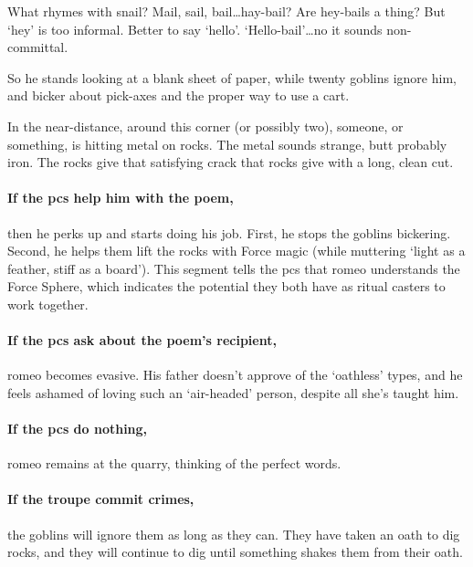 \begin{multicols}{2}
\begin{speechtext}
  What rhymes with snail?
  Mail, sail, bail\ldots hay-bail?
  Are hey-bails a thing?
  But `hey' is too informal.
  Better to say `hello'.
  `Hello-bail'\ldots no it sounds non-committal.
\end{speechtext}

So he stands looking at a blank sheet of paper, while twenty goblins ignore him, and bicker about pick-axes and the proper way to use a cart.

\begin{boxtext}
  In the near-distance, around this corner (or possibly two), someone, or something, is hitting metal on rocks.
  The metal sounds strange, butt probably iron.
  The rocks give that satisfying crack that rocks give with a long, clean cut.
\end{boxtext}

\paragraph{If the \glspl{pc} help him with the poem,}
then he perks up and starts doing his job.
First, he stops the goblins bickering.
Second, he helps them lift the rocks with Force magic (while muttering `light as a feather, stiff as a board').
This \gls{segment} tells the \glspl{pc} that \gls{romeo} understands the Force Sphere, which indicates the potential they both have as ritual casters to work together.

\paragraph{If the \glspl{pc} ask about the poem's recipient,}
\gls{romeo} becomes evasive.
His father doesn't approve of the `oathless' types, and he feels ashamed of loving such an `air-headed' person, despite all she's taught him.

\paragraph{If the \glspl{pc} do nothing,}
\gls{romeo} remains at the quarry, thinking of the perfect words.

\paragraph{If the troupe commit crimes,}
the goblins will ignore them as long as they can.
They have taken an oath to dig rocks, and they will continue to dig until something shakes them from their oath.


\end{multicols}
